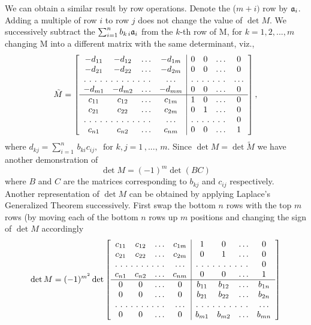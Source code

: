 We can obtain a similar result by row operations. Denote the ($m+i)$ row by $\mathfrak{a}_i$.  Adding a multiple of row $i$ to row $j$ does not change the value of $\det M$.
We successively subtract the $\sum_{i=1}^n b_{k\, i} \mathfrak{a}_i$ from the $k$-th row of M, for $k=1, 2, ..., m$ changing M into a different matrix with the same determinant, viz.,
 \begin{equation}
 \tilde M=
\left[
  \begin{array}{cccc|cccc}
  -d_{11} &  -d_{12} & \hdots & -d_{1m}  & 0 & 0& \hdots & 0\\
  -d_{21} & -d_{22}  & \hdots  & -d_{2m}  & 0 & 0 & \hdots & 0\\
  \hdotsfor[2]{3} & \hdots &\hdotsfor[2]{3} & \hdots\\
  -d_{m1} & -d_{m2} & \hdots  & -d_{mm} & 0 & 0 & \hdots & 0\\
  \hline
  c_{11} &  c_{12} &\hdots & c_{1m} & 1 & 0& \hdots & 0\\
  c_{21} &  c_{22} &\hdots & c_{2m} & 0 & 1& \hdots & 0\\
  \hdotsfor[2]{3} & \hdots & \hdotsfor[2]{3} & 0\\
  c_{n1} &  c_{n2} &\hdots & c_{nm} & 0 & 0& \hdots& 1 
\end{array} \right],
\end{equation}where $\displaystyle{d_{kj} = \sum_{i=1}^n \, b_{ki} c_{ij}}, ~\mbox{ for } k,j = 1\,,...,\,m$. Since $\det M = \det \tilde M$ we have another demonstration of 
\begin{equation}
\det M = (-1)^m \det (BC)
\end{equation} where $B$ and $C$ are the matrices corresponding to $b_{kj}$ and $c_{ij}$ respectively.\\

Another representation of $\det M$ can be obtained by applying Laplace's Generalized Theorem successively. First swap the bottom $n$ rows with the top $m$ rows (by moving each of the bottom $n$ rows up $m$ positions and changing the sign of $\det M$ accordingly
\begin{equation}
\det M = (-1)^{m^2}
\det \left[
  \begin{array}{cccc|cccc}
  c_{11} &  c_{12} &\hdots & c_{1m} & 1 & 0& \hdots & 0\\
  c_{21} &  c_{22} &\hdots & c_{2m} & 0 & 1& \hdots & 0\\
  \hdotsfor[2]{3} & \hdots & \hdotsfor[2]{3} & 0\\
  c_{n1} &  c_{n2} &\hdots & c_{nm} & 0 & 0& \hdots& 1 \\
  \hline
  0 &  0 & \hdots & 0  & b_{11} & b_{12} & \hdots & b_{1n}\\
  0 & 0 & \hdots  & 0 & b_{21} & b_{22} & \hdots & b_{2n}\\
  \hdotsfor[2]{3} & \hdots &\hdotsfor[2]{3} & \hdots\\
  0 & 0 & \hdots  & 0 & b_{m1} & b_{m2} & \hdots & b_{mn}
\end{array} \right]
\end{equation}

